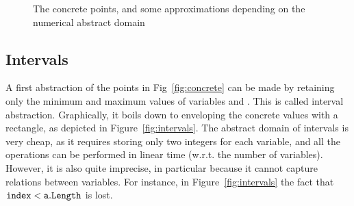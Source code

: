 \documentclass{elsart}
\begin{document}
\begin{figure}[t]
\qquad
{}
\caption{The concrete points, and some approximations depending on the numerical abstract domain}
\label{fig:example}
\end{figure}

\subsection{Intervals} 
A first abstraction of the points in Fig~\ref{fig:concrete} can be
made by retaining only the minimum and maximum values of variables  and .
This is called interval abstraction. Graphically, it boils down to enveloping the concrete values with a rectangle, as depicted in Figure~\ref{fig:intervals}.
The abstract domain of intervals is very cheap, as it requires
storing only two integers for each variable, and all the operations can be performed in linear time (w.r.t. the number of variables).
However, it is also quite imprecise, in particular because it cannot capture relations between variables.
For instance, in Figure~\ref{fig:intervals} the fact that $\mathtt{index} < \mathtt{a.Length}$ is lost.
 
\end{document}
